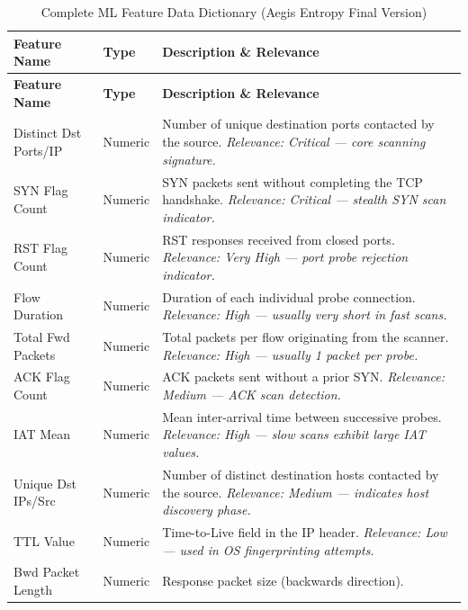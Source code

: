\documentclass[12pt,a4paper]{report}
\begin{document}
\begin{longtable}{@{}L{4cm} C{2cm} L{8.5cm}@{}}
  \caption{Complete ML Feature Data Dictionary (Aegis Entropy Final Version)}
  \label{tab:data-dict} \\
  \toprule
  \textbf{Feature Name} & \textbf{Type} & \textbf{Description \& Relevance} \\
  \midrule
  \endfirsthead
  \toprule
  \textbf{Feature Name} & \textbf{Type} & \textbf{Description \& Relevance} \\
  \midrule
  \endhead
  \bottomrule
  \endfoot

  Distinct Dst Ports/IP
    & Numeric
    & Number of unique destination ports contacted by the source.
      \textit{Relevance: Critical --- core scanning signature.} \\
  \addlinespace
  SYN Flag Count
    & Numeric
    & SYN packets sent without completing the TCP handshake.
      \textit{Relevance: Critical --- stealth SYN scan indicator.} \\
  \addlinespace
  RST Flag Count
    & Numeric
    & RST responses received from closed ports.
      \textit{Relevance: Very High --- port probe rejection indicator.} \\
  \addlinespace
  Flow Duration
    & Numeric
    & Duration of each individual probe connection.
      \textit{Relevance: High --- usually very short in fast scans.} \\
  \addlinespace
  Total Fwd Packets
    & Numeric
    & Total packets per flow originating from the scanner.
      \textit{Relevance: High --- usually 1 packet per probe.} \\
  \addlinespace
  ACK Flag Count
    & Numeric
    & ACK packets sent without a prior SYN.
      \textit{Relevance: Medium --- ACK scan detection.} \\
  \addlinespace
  IAT Mean
    & Numeric
    & Mean inter-arrival time between successive probes.
      \textit{Relevance: High --- slow scans exhibit large IAT values.} \\
  \addlinespace
  Unique Dst IPs/Src
    & Numeric
    & Number of distinct destination hosts contacted by the source.
      \textit{Relevance: Medium --- indicates host discovery phase.} \\
  \addlinespace
  TTL Value
    & Numeric
    & Time-to-Live field in the IP header.
      \textit{Relevance: Low --- used in OS fingerprinting attempts.} \\
  \addlinespace
  Bwd Packet Length
    & Numeric
    & Response packet size (backwards direction).

\end{longtable}
\end{document}

